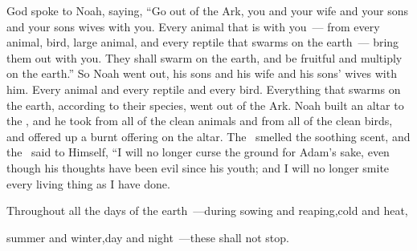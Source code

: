 \begin{inparaenum}
   God spoke to Noah, saying,%
   ``Go out of the Ark, you and your wife and your sons and your sons wives with you.%
   Every animal that is with you~--- from every animal, bird, large animal, and every reptile that swarms on the earth~--- bring them out with you. They shall swarm on the earth, and be fruitful and multiply on the earth.''%
   So Noah went out, his sons and his wife and his sons' wives with him.%
   Every animal and every reptile and every bird. Everything that swarms on the earth, according to their species, went out of the Ark.%
   Noah built an altar to the \lord, and he took from all of the clean animals and from all of the clean birds, and offered up a burnt offering on the altar.%
   The \lord\ smelled the soothing scent, and the \lord\ said to Himself, ``I will no longer curse the ground for Adam's sake, even though his thoughts have been evil since his youth; and I will no longer smite every living thing as I have done.%

  \pc{} Throughout all the days of the earth~---\pa{}during sowing and reaping,\pa{}cold and heat,%

  \pc{}summer and winter,\pa{}day and night~---\pa{}these shall not stop.%
\end{inparaenum}

